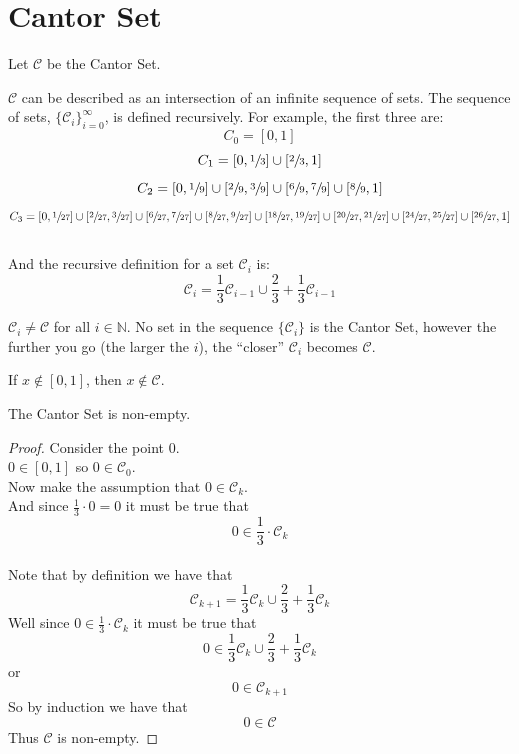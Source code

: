 \documentclass[11pt]{ekblite}
\begin{document}
\section{Cantor Set}
	Let $\mathcal{C}$ be the Cantor Set.
	\begin{definition}
        $\mathcal{C}$ can be described as an intersection of an infinite sequence of sets. The sequence of sets, $\{\mathcal{C}_i\}_{i=0}^{\infty}$, is defined recursively. For example, the first three are:
		\[C_0 = [0,1]\]
		\[C_1 = \left[0,\sfrac{1}{3}  \right] \cup \left[ \sfrac{2}{3},1\right]\]
		\[C_2 = \left[0,\sfrac{1}{9}  \right] \cup \left[ \sfrac{2}{9},\sfrac{3}{9} \right] \cup \left[\sfrac{6}{9},\sfrac{7}{9}\right] \cup \left[ \sfrac{8}{9},1\right]\]
		\[C_3 = \left[0,\sfrac{1}{27}  \right] \cup \left[\sfrac{2}{27},\sfrac{3}{27}  \right] \cup \left[\sfrac{6}{27},\sfrac{7}{27}  \right] \cup \left[\sfrac{8}{27},\sfrac{9}{27}  \right] \cup \left[\sfrac{18}{27},\sfrac{19}{27}  \right] \cup \left[\sfrac{20}{27},\sfrac{21}{27}  \right] \cup \left[\sfrac{24}{27},\sfrac{25}{27}  \right] \cup \left[\sfrac{26}{27},1  \right]\]
		\\
		And the recursive definition for a set $\mathcal{C}_i$ is:
		\[\mathcal{C}_i = \frac{1}{3} \mathcal{C}_{i-1} \cup \frac{2}{3} + \frac{1}{3} \mathcal{C}_{i-1}\]
	\end{definition}
	\begin{corollary}
		$\mathcal{C}_i \ne \mathcal{C}$ for all $i \in \mathbb{N}$. No set in the sequence $\{\mathcal{C}_i\}$ is the Cantor Set, however the further you go (the larger the $i$), the ``closer'' $\mathcal{C}_i$ becomes $\mathcal{C}$. 
	\end{corollary}
	\begin{corollary}
		If $x \notin [0,1]$, then $x \notin \mathcal{C}$.
	\end{corollary}
	\begin{corollary}
		The Cantor Set is non-empty.
	\end{corollary}
	\begin{proof}Consider the point 0.
	\\[0.2in]$0 \in [0,1]$ so $0 \in \mathcal{C}_0$.
	\\[0.2in]Now make the assumption that $0 \in \mathcal{C}_k$.
	\\[0.2in]And since $\frac{1}{3} \cdot 0 = 0$ it must be true that
	\[0 \in \frac{1}{3} \cdot \mathcal{C}_k\] 
	\\[0.2in]Note that by definition we have that
	\[\mathcal{C}_{k+1} = \frac{1}{3} \mathcal{C}_{k} \cup \frac{2}{3} + \frac{1}{3} \mathcal{C}_{k}\]
	Well since $0 \in \frac{1}{3} \cdot \mathcal{C}_k$ it must be true that
	\[0 \in \frac{1}{3} \mathcal{C}_{k} \cup \frac{2}{3} + \frac{1}{3} \mathcal{C}_{k}\]
	or
	\[0 \in \mathcal{C}_{k+1}\]
	So by induction we have that
	\[0 \in \mathcal{C}\]
	Thus $\mathcal{C}$ is non-empty.
	\end{proof}
\end{document}
